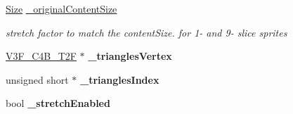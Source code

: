 \begin{DoxyCompactItemize}
\mbox{\label{classSprite_a147f93335fbceb7e27973beda84577d8}} 
\hyperlink{classSize}{Size} \hyperlink{classSprite_a147f93335fbceb7e27973beda84577d8}{\+\_\+original\+Content\+Size}
\begin{DoxyCompactList}\small\item\em stretch factor to match the content\+Size. for 1-\/ and 9-\/ slice sprites \end{DoxyCompactList}\item 
\mbox{\label{classSprite_a28a4ee6b623a6cee81e312d6076ae1b4}} 
\hyperlink{structV3F__C4B__T2F}{V3\+F\+\_\+\+C4\+B\+\_\+\+T2F} $\ast$ {\bfseries \+\_\+triangles\+Vertex}
\item 
\mbox{\label{classSprite_a536c14945811dd24dc626ba4e9012264}} 
unsigned short $\ast$ {\bfseries \+\_\+triangles\+Index}
\item 
\mbox{\label{classSprite_a0f6cc01f2d4e6d628aa61c96e7a1f2f7}} 
bool {\bfseries \+\_\+stretch\+Enabled}
\end{DoxyCompactItemize}
